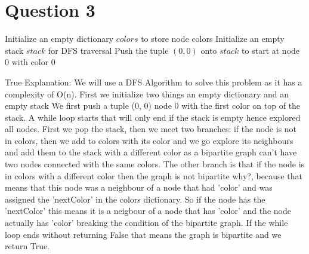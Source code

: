 \documentclass{report}
\begin{document}
	\section*{Question 3}
	\begin{algorithm}[H]
		\SetAlgoLined
		Initialize an empty dictionary \(colors\) to store node colors\;
		Initialize an empty stack \(stack\) for DFS traversal\;
		Push the tuple \((0, 0)\) onto \(stack\) to start at node 0 with color 0\;
		
		\Return True \;
		Explanation: We will use a DFS Algorithm to solve this problem as it has a complexity of O(n). First we initialize two things an empty dictionary and an empty stack
		\newline We first push a tuple (0, 0) node 0 with the first color on top of the stack. 
		\newline A while loop starts that will only end if the stack is empty hence explored all nodes. First we pop the stack, then we meet two branches: if the node is not in colors, then we add to colors with its color and we go explore its neighbours and add them to the stack with a different color as a bipartite graph can't have two nodes connected with the same colors.
		\newline The other branch is that if the node is in colors with a different color then the graph is not bipartite why?, because that means that this node was a neighbour of a node that had 'color' and was assigned the 'nextColor' in the colors dictionary. So if the node has the 'nextColor' this means it is a neigbour of a node that has 'color' and the node actually has 'color' breaking the condition of the bipartite graph.
		\newline If the while loop ends without returning False that means the graph is bipartite and we return True.
	\end{algorithm}
	
	
\end{document}
